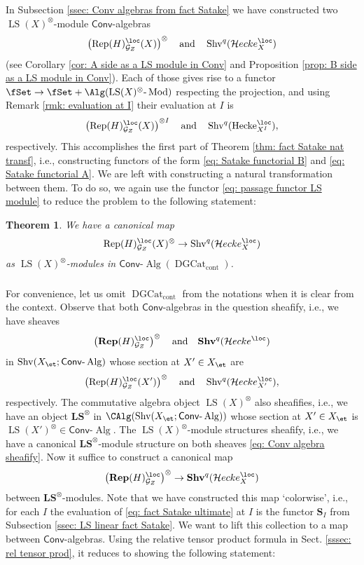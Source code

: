 \documentclass[10pt]{amsart}
\newcommand{\sssec}{\subsubsection}
\newtheorem{thm}[subsubsection]{Theorem}
\theoremstyle{remark}
\newcommand{\te}{\text}
\newcommand{\on}{\operatorname}
\newcommand{\cG}{\mathcal{G}}
\newcommand{\DGcat}{\on{DGCat}_{\on{cont}}}
\newcommand{\lMod}{\text{-}\on{Mod}}
\newcommand{\lAlg}{\text{-}\on{Alg}}
\newcommand{\Rep}{\on{Rep}}
\newcommand{\Shv}{\on{Shv}}
\newcommand{\LS}{\on{LS}}
\newcommand{\Hecke}{\on{Hecke}}
\newcommand{\Conv}{\mathsf{Conv}}
\newcommand{\cHecke}{\mathcal{H}ecke}
\begin{document}
In Subsection \ref{ssec: Conv algebras from fact Satake} we have constructed two $\LS(X)^{\otimes}$-module $\Conv$-algebras
\[\left(\Rep(H)^{\loc}_{\cG_Z}(X)\right)^{\otimes}\quad \te{and}\quad \Shv^q(\cHecke^{\loc}_X)\]
(see Corollary \ref{cor: A side as a LS module in Conv} and Proposition \ref{prop: B side as a LS module in Conv}).
Each of those gives rise to a functor $\fSet\rightarrow \fSet+\Alg(\LS(X)^{\otimes}\lMod)$ respecting the projection, and using Remark \ref{rmk: evaluation at I} their evaluation at $I$ is 
\[\left(\Rep(H)^{\loc}_{\cG_Z}(X)\right)^{\otimes I}\quad \te{and}\quad \Shv^q(\Hecke^{\loc}_{X^I}),\]
respectively. This accomplishes the first part of Theorem \ref{thm: fact Satake nat transf}, i.e., constructing functors of the form \eqref{eq: Satake functorial B} and \eqref{eq: Satake functorial A}. We are left with constructing a natural transformation between them. To do so, we again use the functor \eqref{eq: passage functor LS module} to reduce the problem to the following statement:

\begin{thm}\label{thm: fact Satake Conv at X}
    We have a canonical map
    \[\Rep(H)^{\loc}_{\cG_Z}(X)^{\otimes}\rightarrow \Shv^q(\cHecke^{\loc}_X)\]
    as $\LS(X)^{\otimes}$-modules in $\Conv\lAlg(\DGcat)$.
\end{thm}

\sssec{}
    For convenience, let us omit $\DGcat$ from the notations when it is clear from the context. Observe that both $\Conv$-algebras in the question sheafify, i.e., we have sheaves
    \begin{equation}\label{eq: Conv algebra sheafify}
        \left(\mathbf{Rep}(H)^{\loc}_{\cG_Z}\right)^{\otimes} \quad \te{and}\quad \mathbf{Shv}^q(\cHecke^{\loc})
    \end{equation}
    in $\Shv(X_{\et};\Conv\lAlg)$ whose section at $X'\in X_{\et}$ are
    \[\left(\Rep(H)^{\loc}_{\cG_Z}(X')\right)^{\otimes}\quad\te{and}\quad \Shv^q(\cHecke^{\loc}_{X'}),\]
    respectively. The commutative algebra object $\LS(X)^{\otimes}$ also sheafifies, i.e., we have an object $\mathbf{LS}^{\otimes}$ in $\CAlg(\Shv(X_{\et};\Conv\lAlg))$ whose section at $X'\in X_{\et}$ is $\LS(X')^{\otimes}\in\Conv\lAlg$. The $\LS(X)^{\otimes}$-module structures sheafify, i.e., we have a canonical $\mathbf{LS}^{\otimes}$-module structure on both sheaves \eqref{eq: Conv algebra sheafify}. Now it suffice to construct a canonical map
    \begin{equation}\label{eq: fact Satake ultimate}
        \left(\mathbf{Rep}(H)^{\loc}_{\cG_Z}\right)^{\otimes} \rightarrow \mathbf{Shv}^q(\cHecke^{\loc}_X)
    \end{equation}
    between $\mathbf{LS}^{\otimes}$-modules. Note that we have constructed this map `colorwise', i.e., for each $I$ the evaluation of \eqref{eq: fact Satake ultimate} at $I$ is the functor $\textbf{S}_I$ from Subsection \ref{ssec: LS linear fact Satake}. We want to lift this collection to a map between $\Conv$-algebras. 
   Using the relative tensor product formula in Sect. \ref{sssec: rel tensor prod}, it reduces to showing the following statement:
   
\end{document}
